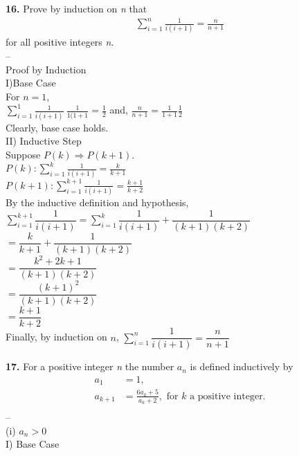 \documentclass[paper=letter, fontsize=11pt]{scrartcl} %
\begin{document}
\textbf{16.} Prove by induction on \textit{n} that
\begin{align*}
	\sum_{i=1}^{n} \frac{1}{i(i+1)} = \frac{n}{n+1}
\end{align*}
for all positive integers \textit{n}. \\
--\\

Proof by Induction \\

I)Base Case \\

For $n = 1$, \\
$\sum_{i=1}^1 \frac{1}{i(i+1)} \ \frac{1}{1(1+1} = \frac{1}{2}$ 
and, $\frac{n}{n+1} = \frac{1}{1+1} \frac{1}{2}$ \\

Clearly, base case holds.\\

II) Inductive Step \\
Suppose $P(k) \Rightarrow P(k + 1)$. \\

$P(k): \sum_{i=1}^{k} \frac{1}{i(i+1)} = \frac{k}{k+1}$ \\
$P(k+1): \sum_{i=1}^{k+1} \frac{1}{i(i+1)} = \frac{k+1}{k+2}$ \\
By the inductive definition and hypothesis, \\
$\sum_{i=1}^{k+1} \dfrac{1}{i(i+1)} = \sum_{i=1}^{k}
 \dfrac{1}{i(i+1)} + \dfrac{1}{(k+1)(k+2)}$ \\
$= \dfrac{k}{k+1}+\dfrac{1}{(k+1)(k+2)}$ \\
$= \dfrac{k^2 + 2k + 1}{(k+1)(k+2)}$ \\
$= \dfrac{(k+1)^2}{(k+1)(k+2)}$ \\
$= \dfrac{k+1}{k+2}$ \\

Finally, by induction on $n$, $\sum_{i=1}^n \dfrac{1}{i(i+1)} = \dfrac{n}{n+1}$

\textbf{17.} For a positive integer \textit{n} the number $a_n$ is defined inductively by
\begin{align*}
	a_1 &= 1, \\
	a_{k+1} &= \frac{6a_k + 5}{a_k + 2}, \text{  for } k \text{ a positive integer.} \\
\end{align*}
-- \\
(i) $a_n > 0$ \\
I) Base Case \\
\end{document}
